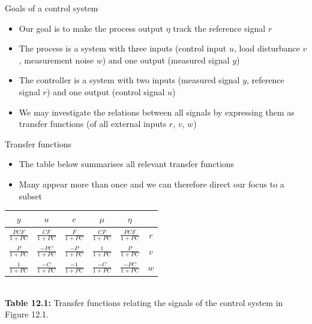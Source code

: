 \documentclass[10pt]{beamer-control}
\begin{document}
\begin{frame}{Goals of a control system}
  \begin{itemize}
    \item Our goal is to make the process output $\eta$ track the reference signal $r$
    \item The process is a system with three inputs (control input $u$, load disturbance $v$, measurement noise $w$) and one output (measured signal $y$)
    \item The controller is a system with two inputs (measured signal $y$, reference signal $r$)  and one output (control signal $u$)
    \item We may investigate the relations between all signals by expressing them as transfer functions (of all external inputs $r$, $v$, $w$)
  \end{itemize}
\end{frame}


\begin{frame}{Transfer functions}
  \begin{itemize}
    \item The table below summarises all relevant transfer functions
    \item Many appear more than once and we can therefore direct our focus to a subset
  \end{itemize}

  \centering
  \Large{
    \begin{table}
      \begin{tabular}{ccccc| c}
        \hline $y$ & $u$ & $e$ & $\mu$ & $\eta$ & \\
        \hline $\frac{P C F}{1+P C}$ & $\frac{C F}{1+P C}$ & $\frac{F}{1+P C}$ & $\frac{C F}{1+P C}$ & $\frac{P C F}{1+P C}$ & $r$\\[1ex]
        $\frac{P}{1+P C}$ & $\frac{-P C}{1+P C}$ & $\frac{-P}{1+P C}$ & $\frac{1}{1+P C}$ & $\frac{P}{1+P C}$ & $v$\\[1ex]
        $\frac{1}{1+P C}$ & $\frac{-C}{1+P C}$ & $\frac{-1}{1+P C}$ & $\frac{-C}{1+P C}$ & $\frac{-P C}{1+P C}$ & $w$ \\[1ex]
        \hline
      \end{tabular}\\
      \vspace{.5cm}
      \normalsize{\textbf{Table 12.1:} Transfer functions relating the signals of the control system in Figure 12.1.}
    \end{table}}
\end{frame}
\end{document}
